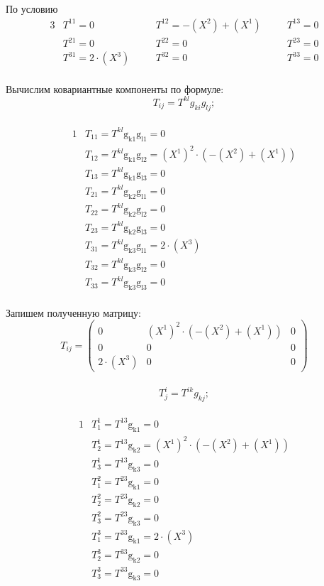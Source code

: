 \documentclass[a4paper, 12pt, oneside]{article}
\begin{document}
По условию\\
\begin{alignat*}{3}
  & T^{11} = 0 \quad &&T^{12} = -(X^2) + (X^1) \quad &&T^{13} = 0 \\
  & T^{21} = 0 \quad &&T^{22} = 0 \quad &&T^{23} = 0 \\
  & T^{31} = 2\cdot (X^3) \quad &&T^{32} = 0 \quad &&T^{33} = 0 
\end{alignat*}\\
Вычислим ковариантные компоненты по формуле:\\
\[
T_{ij} = T^{kl}g_{ki}g_{lj};
\]\\
\begin{alignat*}{1}
  & T_{11} = T^{kl}\mathrm{g_{k1}g_{l1} = }0 \\
  & T_{12} = T^{kl}\mathrm{g_{k1}g_{l2} = }(X^1)^2\cdot (-(X^2) + (X^1)) \\
  & T_{13} = T^{kl}\mathrm{g_{k1}g_{l3} = }0 \\
  & T_{21} = T^{kl}\mathrm{g_{k2}g_{l1} = }0 \\
  & T_{22} = T^{kl}\mathrm{g_{k2}g_{l2} = }0 \\
  & T_{23} = T^{kl}\mathrm{g_{k2}g_{l3} = }0 \\
  & T_{31} = T^{kl}\mathrm{g_{k3}g_{l1} = }2\cdot (X^3) \\
  & T_{32} = T^{kl}\mathrm{g_{k3}g_{l2} = }0 \\
  & T_{33} = T^{kl}\mathrm{g_{k3}g_{l3} = }0 
\end{alignat*}\\
Запишем полученную матрицу:\\
\[
T_{ij}=\begin{pmatrix}
	0 & (X^1)^2\cdot (-(X^2) + (X^1)) & 0\\
	0 & 0 & 0\\
	2\cdot (X^3) & 0 & 0
\end{pmatrix}
\]\\
\[
T^i_j = T^{ik}g_{kj};
\]\\
\begin{alignat*}{1}
  & T^1_1 = T^{13}\mathrm{g_{k1} = }0 \\
  & T^1_2 = T^{13}\mathrm{g_{k2} = }(X^1)^2\cdot (-(X^2) + (X^1)) \\
  & T^1_3 = T^{13}\mathrm{g_{k3} = }0 \\
  & T^2_1 = T^{23}\mathrm{g_{k1} = }0 \\
  & T^2_2 = T^{23}\mathrm{g_{k2} = }0 \\
  & T^2_3 = T^{23}\mathrm{g_{k3} = }0 \\
  & T^3_1 = T^{33}\mathrm{g_{k1} = }2\cdot (X^3) \\
  & T^3_2 = T^{33}\mathrm{g_{k2} = }0 \\
  & T^3_3 = T^{33}\mathrm{g_{k3} = }0 
\end{alignat*}\\
\end{document}
